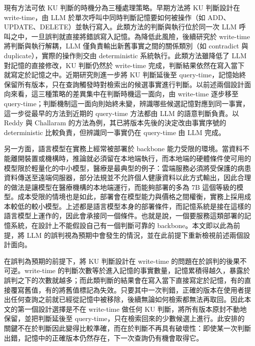 現有方法可依 KU 判斷的時機分為三種處理策略。早期方法將 KU 判斷設計在 write-time，由 LLM 於單次呼叫中同時判斷記憶要如何被操作（如 ADD、UPDATE、DELETE）並執行寫入\cite{chhikara2025mem0}\hspace{-0.05em}\cite{fang2026lightmem}。此類方法的判斷與執行位於同一次 LLM 呼叫之中，一旦誤判就直接將錯誤寫入記憶。為降低此風險，後續研究於 write-time 將判斷與執行解耦，LLM 僅負責輸出新舊事實之間的關係類別（如 contradict 與 duplicate），實際的操作則交由 deterministic 系統執行\cite{rasmussen2025zep}\hspace{-0.05em}\cite{wang2026less}。此類方法雖降低了 LLM 對記憶的直接修改，KU 判斷仍然於 write-time 完成，判斷結果依然在寫入當下就寫定於記憶之中。近期研究則進一步將 KU 判斷延後至 query-time，記憶始終保留所有版本，只在查詢觸發時對檢索出的候選事實進行判斷\cite{reddy2026don}。以前述兩個設計面向來看，這三種策略的差異集中在判斷時機這一面向，由 write-time 逐步移至 query-time；判斷機制這一面向則始終未變，辨識哪些候選記憶對應到同一事實，這一步從最早的方法到近期的 query-time 方法都由 LLM 的語意判斷負責。以 Reddy 與 Challaram 的方法為例，其已將版本先後的決定改由事實序號的 deterministic 比較負責，但辨識同一事實仍在 query-time 由 LLM 完成\cite{reddy2026don}。

另一方面，語言模型在實務上經常被部署於 backbone 能力受限的環境。當資料不能離開裝置或機構時，推論就必須留在本地端執行，而本地端的硬體條件使可用的模型限於輕量化的中小模型，醫療是最典型的例子：雲端服務必須將受保護的病患資料傳送至遠端伺服器，部分法規並不允許個人健康資料以此方式輸出，因此合理的做法是讓模型在醫療機構的本地端運行，而能夠部署的多為 7B 這個等級的模型\cite{wiest2025deidentifying}\hspace{-0.05em}\cite{wiest2024privacy}\hspace{-0.05em}\cite{pham2025slimlm}。成本受限的情境也是如此，部署會在模型能力與價格之間權衡，實務上採用成本較低的較小模型\cite{chenfrugalgpt}。上述都是語言模型本身的部署條件，而記憶系統是接在這樣的語言模型上運作的，因此會承接同一個條件。也就是說，一個要服務這類部署的記憶系統，在設計上不能假設自己有一個判斷可靠的 backbone。本文即以此為前提，將 LLM 的誤判視為預期中會發生的情況，並在此前提下重新檢視前述兩個設計面向。

在誤判為預期的前提下，將 KU 判斷設計在 write-time 的問題在於誤判的後果不可逆。write-time 的判斷次數等於進入記憶的事實數量，記憶累積得越久，暴露於誤判之下的次數就越多；而此類判斷的結果會在寫入當下直接寫定於記憶，有的直接覆寫舊值，有的將舊值標記為失效。只要其中一次判錯，正確的版本在使用者提出任何查詢之前就已經從記憶中被移除，後續無論如何檢索都無法再取回。因此本文的第一個設計選擇是不在 write-time 做任何 KU 判斷，將所有版本原封不動地保留，並把判斷延後至 query-time，只在檢索回來的少數候選上進行。此安排的關鍵不在於判斷因此變得比較準確，而在於判斷不再具有破壞性：即使某一次判斷出錯，記憶中的正確版本仍然存在，下一次查詢仍有機會取得它。

